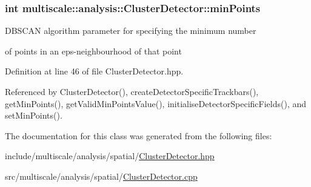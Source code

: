 \hypertarget{classmultiscale_1_1analysis_1_1ClusterDetector_aa94df1adc462be5931ec25ba24122fe9}{
\subsubsection[{min\-Points}]{\setlength{\rightskip}{0pt plus 5cm}int multiscale\-::analysis\-::\-Cluster\-Detector\-::min\-Points\hspace{0.3cm}{\ttfamily [protected]}}}\label{classmultiscale_1_1analysis_1_1ClusterDetector_aa94df1adc462be5931ec25ba24122fe9}
\begin{DoxyVerb}                  DBSCAN algorithm parameter for specifying the minimum number
\end{DoxyVerb}
 of points in an eps-\/neighbourhood of that point 

Definition at line 46 of file Cluster\-Detector.\-hpp.



Referenced by Cluster\-Detector(), create\-Detector\-Specific\-Trackbars(), get\-Min\-Points(), get\-Valid\-Min\-Points\-Value(), initialise\-Detector\-Specific\-Fields(), and set\-Min\-Points().



The documentation for this class was generated from the following files\-:\begin{DoxyCompactItemize}
\item 
include/multiscale/analysis/spatial/\hyperlink{ClusterDetector_8hpp}{Cluster\-Detector.\-hpp}\item 
src/multiscale/analysis/spatial/\hyperlink{ClusterDetector_8cpp}{Cluster\-Detector.\-cpp}\end{DoxyCompactItemize}
